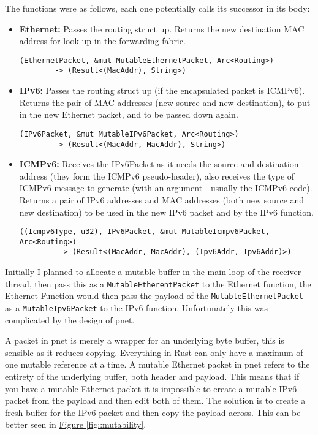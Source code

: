 \documentclass[12pt,a4paper,twoside,openany]{report}
\begin{document}
The functions were as follows, each one potentially calls its successor in its body:
\begin{itemize}
\item \textbf{Ethernet:} Passes the routing struct up. Returns the new destination MAC address for look up in the forwarding fabric.
\begin{verbatim}(EthernetPacket, &mut MutableEthernetPacket, Arc<Routing>)
        -> (Result<(MacAddr), String>)
\end{verbatim}
\item \textbf{IPv6:} Passes the routing struct up (if the encapsulated packet is ICMPv6). Returns the pair of MAC addresses (new source and new destination), to put in the new Ethernet packet, and to be passed down again.
\begin{verbatim}(IPv6Packet, &mut MutableIPv6Packet, Arc<Routing>)
        -> (Result<(MacAddr, MacAddr), String>)
\end{verbatim}
\item \textbf{ICMPv6:} Receives the IPv6Packet as it needs the source and destination address (they form the ICMPv6 pseudo-header), also receives the type of ICMPv6 message to generate (with an argument - usually the ICMPv6 code). Returns a pair of  IPv6 addresses and MAC addresses (both new source and new destination) to be used in the new IPv6 packet and by the IPv6 function.
\begin{verbatim}((Icmpv6Type, u32), IPv6Packet, &mut MutableIcmpv6Packet, Arc<Routing>) 
         -> (Result<(MacAddr, MacAddr), (Ipv6Addr, Ipv6Addr)>)
\end{verbatim}
\end{itemize}
Initially I planned to allocate a mutable buffer in the main loop of the receiver thread, then pass this as a \verb!MutableEtherentPacket! to the Ethernet function, the Ethernet Function would then pass the payload of the \verb!MutableEthernetPacket! as a \verb!MutableIpv6Packet! to the IPv6 function. Unfortunately this was complicated by the design of pnet.  

A packet in pnet is merely a wrapper for an underlying byte buffer, this is sensible as it reduces copying.  Everything in Rust can only have a maximum of one mutable reference at a time.  A mutable Ethernet packet in pnet refers to the entirety of the underlying buffer, both header and payload.  This means that if you have a mutable Ethernet packet it is impossible to create a mutable IPv6 packet from the payload and then edit both of them.  The solution is to create a fresh buffer for the IPv6 packet and then copy the payload across. This can be better seen in  \hyperref[fig::mutability]{Figure }\ref{fig::mutability}.
\end{document}
